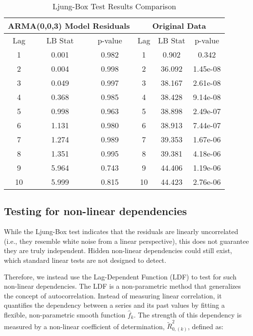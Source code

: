 \documentclass{article}
\begin{document}
\begin{table}[H]
\centering
\caption{Ljung-Box Test Results Comparison}
\label{tab:ljungbox}
\begin{tabular}{@{}ccc|ccc@{}}
\toprule
\multicolumn{3}{c|}{\textbf{ARMA(0,0,3) Model Residuals}} & \multicolumn{3}{c}{\textbf{Original Data}} \\
\midrule
Lag & LB Stat & p-value & Lag & LB Stat & p-value \\
\midrule
1 & 0.001 & 0.982 & 1 & 0.902 & 0.342 \\
2 & 0.004 & 0.998 & 2 & 36.092 & 1.45e-08 \\
3 & 0.049 & 0.997 & 3 & 38.167 & 2.61e-08 \\
4 & 0.368 & 0.985 & 4 & 38.428 & 9.14e-08 \\
5 & 0.998 & 0.963 & 5 & 38.898 & 2.49e-07 \\
6 & 1.131 & 0.980 & 6 & 38.913 & 7.44e-07 \\
7 & 1.274 & 0.989 & 7 & 39.353 & 1.67e-06 \\
8 & 1.351 & 0.995 & 8 & 39.381 & 4.18e-06 \\
9 & 5.964 & 0.743 & 9 & 44.406 & 1.19e-06 \\
10 & 5.999 & 0.815 & 10 & 44.423 & 2.76e-06 \\
\bottomrule
\end{tabular}
\end{table}

\subsection{Testing for non-linear dependencies}

While the Ljung-Box test indicates that the residuals are linearly uncorrelated (i.e., they resemble white noise from a linear perspective), this does not guarantee they are truly independent. Hidden non-linear dependencies could still exist, which standard linear tests are not designed to detect.

Therefore, we instead use the Lag-Dependent Function (LDF) \citep{ldf} to test for such non-linear dependencies. The LDF is a non-parametric method that generalizes the concept of autocorrelation. Instead of measuring linear correlation, it quantifies the dependency between a series and its past values by fitting a flexible, non-parametric smooth function $\hat{f}_k$. The strength of this dependency is measured by a non-linear coefficient of determination, $\tilde{R}^2_{0,(k)}$, defined as:
\end{document}
